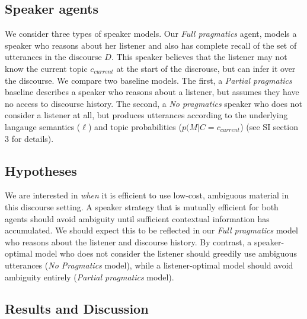 \documentclass[10pt, letterpaper]{article}
\begin{document}
\subsection{Speaker agents}\label{speaker-agents}

We consider three types of speaker models. Our \textit{Full pragmatics}
agent, models a speaker who reasons about her listener and also has
complete recall of the set of utterances in the discourse \(D\). This
speaker believes that the listener may not know the current topic
\(c_{current}\) at the start of the discrouse, but can infer it over the
discourse. We compare two baseline models. The first, a
\textit{Partial pragmatics} baseline describes a speaker who reasons
about a listener, but assumes they have no access to discourse history.
The second, a \textit{No pragmatics} speaker who does not consider a
listener at all, but produces utterances according to the underlying
langauge semantics (\(\ell\)) and topic probabilities
(\(p(M|C=c_{current}\)) (see SI section 3 for details).\par

\subsection{Hypotheses}\label{hypotheses}

We are interested in \textit{when} it is efficient to use low-cost,
ambiguous material in this discourse setting. A speaker strategy that is
mutually efficient for both agents should avoid ambiguity until
sufficient contextual information has accumulated. We should expect this
to be reflected in our \textit{Full pragmatics} model who reasons about
the listener and discourse history. By contrast, a speaker-optimal model
who does not consider the listener should greedily use ambiguous
utterances (\textit{No Pragmatics} model), while a listener-optimal
model should avoid ambiguity entirely (\textit{Partial pragmatics}
model).\par

\subsection{Results and Discussion}\label{results-and-discussion-1}
\end{document}
